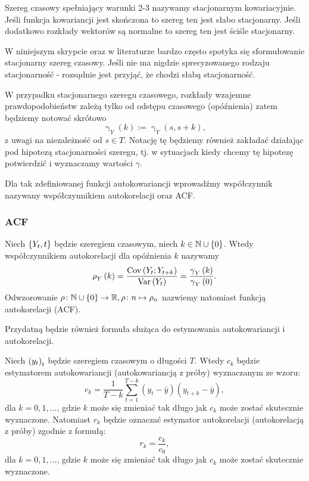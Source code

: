 \documentclass[10pt,a4paper]{book}
\newcommand{\tsAutoCovariance}[3][\gamma]{\operatorname{#1}_{#2} \left({#3}\right)}
\newcommand{\tsAutoCorellation}[3][\rho]{\operatorname{#1}_{#2} \left({#3}\right)}
\begin{document}
\begin{remark}
Szereg czasowy spełniający warunki 2-3 nazywamy stacjonarnym kowariacyjnie. Jeśli funkcja kowariancji jest skończona to szereg ten jest słabo stacjonarny. Jeśli dodatkowo rozkłady wektorów są normalne to szereg ten jest ściśle stacjonarny.
\end{remark}

\begin{remark}
W niniejszym skrypcie oraz w literaturze bardzo często spotyka się sformułowanie stacjonarny szereg czasowy. Jeśli nie ma nigdzie sprecyzowanego rodzaju stacjonarność - rozsądnie jest przyjąć, że chodzi słabą stacjonarność.
\end{remark}

\begin{remark}
W przypadku stacjonarnego szeregu czasowego, rozkłady wzajemne prawdopodobieństw zależą tylko od odstępu czasowego (opóźnienia) zatem będziemy notować skrótowo 
$$
\tsAutoCovariance{Y}{k} := \tsAutoCovariance{Y}{s,s+k},
$$
z uwagi na niezależność od $s \in T$. Notację tę będziemy również zakładać działając pod hipotezą stacjonarności szeregu, tj. w sytuacjach kiedy chcemy tę hipotezę potwierdzić i wyznaczamy wartości $\gamma$.
\end{remark}

Dla tak zdefiniowanej funkcji autokowariancji wprowadźmy współczynnik nazywany współczynnikiem autokorelacji oraz ACF.

\subsubsection{ACF}

\begin{definition}
Niech $\left\lbrace {{Y_t}, {t}} \right\rbrace$ będzie szeregiem czasowym, niech $k \in \mathbb{N} \cup \left\lbrace {0} \right\rbrace $. Wtedy współczynnikiem autokorelacji dla opóźnienia $k$ nazywamy
$$
\tsAutoCorellation{Y}{k}= \frac{\Covariance{Y_t}{Y_{t+k}}}{\Variance{Y_t}} = \frac{\tsAutoCovariance{Y}{k} }{\tsAutoCovariance{Y}{0}}.
$$
Odwzorowanie $\rho\colon \mathbb{N} \cup \left\lbrace {0} \right\rbrace \to \mathbb{R},  \rho \colon n \mapsto \rho_n$ nazwiemy natomiast funkcją autokorelacji (ACF).
\end{definition}

Przydatną będzie również formuła służąca do estymowania autokowariancji i autokorelacji.

\begin{definition}
Niech $\left( {y_t} \right)_{t}^{}$ będzie szeregiem czasowym o długości $T$. Wtedy $c_k$ będzie estymatorem autokowariancji (autokowariancją z próby) wyznaczanym ze wzoru:
$$
c_k = \frac{1}{T-k}	 \sum_{t=1}^{T-k} (y_t - \bar{y}) (y_{t+k} - \bar{y}),
$$
dla $k = 0,1, \ldots$, gdzie $k$ może się zmieniać tak długo jak $c_k$ może zostać skutecznie wyznaczone.
Natomiast $r_k$ będzie oznaczać estymator autokorelacji (autokorelacją z próby) zgodnie z formułą:
$$
r_k = \frac{c_k}{c_0},
$$
dla $k = 0,1, \ldots$, gdzie $k$ może się zmieniać tak długo jak $c_k$ może zostać skutecznie wyznaczone.
\end{definition}
\end{document}
